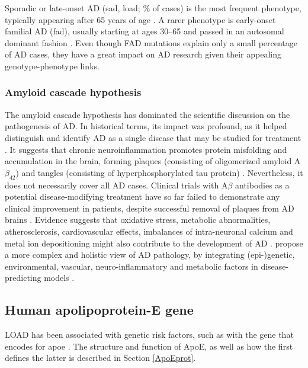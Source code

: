 \documentclass{amsart}
\begin{document}
Sporadic or late-onset AD (\acrshort{sad}, \acrshort{load}; \% of cases) is the most frequent phenotype, typically appearing after 65 years of age \cite{Beydoun2014EpidemiologicMeta-analysis}. A rarer phenotype is early-onset familial AD (\acrshort{fad}), usually starting at ages 30–65 and passed in an autosomal dominant fashion \cite{VanCauwenberghe2015ThePerspectives}.
Even though FAD mutations explain only a small percentage of AD cases, they have a great impact on AD research given their appealing genotype-phenotype links.

\subsubsection*{Amyloid cascade hypothesis}
The amyloid cascade hypothesis has dominated the scientific discussion on the pathogenesis of AD. In historical terms, its impact was profound, as it helped distinguish and identify AD as a single disease that may be studied for treatment \cite{Hardy2006AlzheimersReappraisal}. It suggests that chronic neuroinflammation promotes protein misfolding and accumulation in the brain, forming plaques (consisting of oligomerized amyloid A$\beta_{42}$) and tangles (consisting of hyperphosphorylated tau protein) \cite{Edwards2019ANeurodegeneration}. Nevertheless, it does not necessarily cover all AD cases. Clinical trials with A$\beta$ antibodies as a potential disease-modifying treatment have so far failed to demonstrate any clinical improvement in patients, despite successful removal of plaques from AD brains \cite{Kepp2023TheReview,Kurkinen2023TheThinking}. Evidence suggests that oxidative stress, metabolic abnormalities, atherosclerosis, cardiovascular effects, imbalances of intra-neuronal calcium and metal ion depositioning might also contribute to the development of AD \cite{Kepp2023TheReview}. \citeauthor{Kepp2023TheReview} propose a more complex and holistic view of AD pathology, by integrating (epi-)genetic, environmental, vascular, neuro-inflammatory and metabolic factors in disease-predicting models \cite{Kepp2023TheReview}.

\subsection{Human apolipoprotein-E gene}
LOAD has been associated with genetic risk factors, such as with the gene that encodes for \acrfull{apoe} \cite{Corder1993GeneFamilies}. The structure and function of ApoE, as well as how the first defines the latter is described in Section \ref{ApoEprot}.
\end{document}
